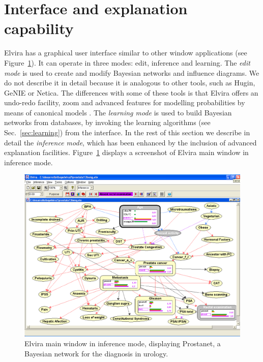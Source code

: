 
\section{Interface and explanation capability}

Elvira has a graphical user interface similar to other window
applications (see Figure~\ref{fig:prostanet}). It can operate in
three modes: edit, inference and learning. The \emph{edit mode} is
used to create and modify Bayesian networks and influence
diagrams. We do not describe it in detail because it is analogous
to other tools, such as Hugin, GeNIE or Netica. The differences
with some of these tools is that Elvira offers an undo-redo
facility, zoom and advanced features for modelling probabilities
by means of canonical models \cite{diez02x}. The \emph{learning
mode} is used to build Bayesian networks from databases, by
invoking the learning algorithms (see Sec.~\ref{sec:learning})
from the interface. In the rest of this section we describe in
detail the \emph{inference mode}, which has been enhanced by the
inclusion of advanced explanation facilities.
Figure~\ref{fig:prostanet} displays a screenshot of Elvira main
window in inference mode.

\begin{figure}[hbt]
\begin{center}
\includegraphics[width=155mm]{gui/fig/prostanet.eps}
\end{center}
\caption{Elvira main window in inference mode, displaying Prostanet,
a Bayesian network for the diagnosis in urology.}%
\label{fig:prostanet}%
\end{figure}

